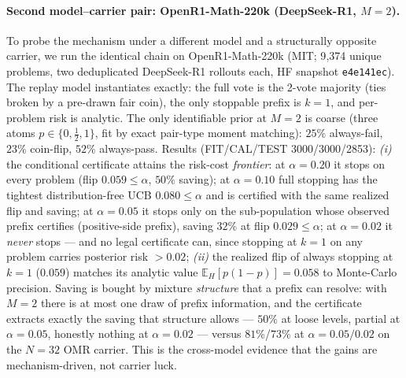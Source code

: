\documentclass{article}
\theoremstyle{definition}
\theoremstyle{remark}
\newcommand{\E}{\mathbb{E}}
\begin{document}
\paragraph{Second model--carrier pair: OpenR1-Math-220k (DeepSeek-R1, $M=2$).}
To probe the mechanism under a different model and a structurally opposite
carrier, we run the identical chain on OpenR1-Math-220k (MIT; 9{,}374 unique
problems, two deduplicated DeepSeek-R1 rollouts each, HF snapshot
\texttt{e4e141ec}). The replay model instantiates exactly: the full vote is
the 2-vote majority (ties broken by a pre-drawn fair coin), the only stoppable
prefix is $k=1$, and per-problem risk is analytic. The only identifiable
prior at $M=2$ is coarse (three atoms $p\in\{0,\tfrac12,1\}$, fit by exact
pair-type moment matching): $25\%$ always-fail, $23\%$ coin-flip, $52\%$
always-pass. Results (FIT/CAL/TEST 3000/3000/2853):
\emph{(i)} the conditional certificate attains the risk-cost \emph{frontier}:
at $\alpha=0.20$ it stops on every problem (flip $0.059\le\alpha$,
$50\%$ saving); at $\alpha=0.10$ full stopping has the tightest
distribution-free UCB $0.080\le\alpha$ and is certified with the same
realized flip and saving; at $\alpha=0.05$ it stops only on the
sub-population whose observed prefix certifies (positive-side prefix),
saving $32\%$ at flip $0.029\le\alpha$; at $\alpha=0.02$ it \emph{never}
stops --- and no legal certificate can, since stopping at $k{=}1$ on any
problem carries posterior risk $>0.02$; \emph{(ii)} the realized flip of
always stopping at $k{=}1$ ($0.059$) matches its analytic value
$\E_H[p(1{-}p)]=0.058$ to Monte-Carlo precision. Saving is bought by mixture \emph{structure} that a prefix can
resolve: with $M=2$ there is at most one draw of prefix information, and the
certificate extracts exactly the saving that structure allows --- $50\%$ at
loose levels, partial at $\alpha=0.05$, honestly nothing at $\alpha=0.02$ ---
versus $81\%$/$73\%$ at $\alpha=0.05/0.02$ on the $N{=}32$ OMR carrier. This
is the cross-model evidence that the gains are mechanism-driven, not carrier
luck.
\end{document}
